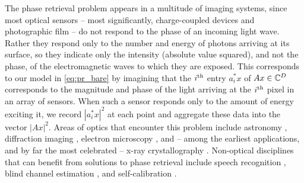   The phase retrieval problem appears in a multitude of imaging systems, since most optical sensors -- most significantly, charge-coupled devices and photographic film -- do not respond to the phase of an incoming light wave.  Rather they respond only to the number and energy of photons arriving at its surface, so they indicate only the intensity (absolute value squared), and not the phase, of the electromagnetic waves to which they are exposed.  This corresponds to our model in \eqref{eq:pr_bare} by imagining that the $i^{\text{th}}$ entry $a_i^* x$ of $Ax \in \mathbb{C}^D$ corresponds to the magnitude and phase of the light arriving at the $i^{\text{th}}$ pixel in an array of sensors.  When such a sensor responds only to the amount of energy exciting it, we record $|a_i^* x|^2$ at each point and aggregate these data into the vector $|A x|^2$.  Areas of optics that encounter this problem include astronomy \cite{fienup1987astronomy,walther1963question}, diffraction imaging \cite{millane1990phase,rodenburg2008diffractive,shechtman2015phase}, electron microscopy \cite{putkunz2012electron}, and -- among the earliest applications, and by far the most celebrated -- x-ray crystallography \cite{bragg1915crystal_structure,marchesini2015coptych,dierolf2008ptych,harrison1993phase,hauptman1953monograph,starodub2008damage}.  Non-optical disciplines that can benefit from solutions to phase retrieval include speech recognition \cite{balan2006signal, juang1993speechrec}, blind channel estimation \cite{strohmer2017wtf_deconv1, strohmer2017wtf_deconv2}, and self-calibration \cite{strohmer2015self_calib}.


